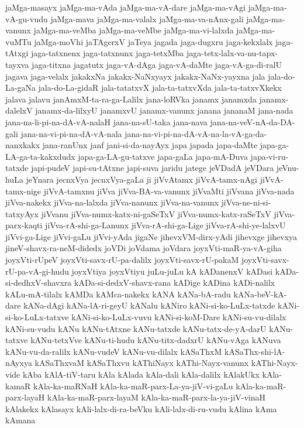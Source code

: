 {jaMga-masayx
jaMga-ma-vAda
jaMga-ma-vA-dare
jaMga-ma-vAgi
jaMga-ma-vA-gu-vudu
jaMga-mava
jaMga-ma-valalx
jaMga-ma-va-nAnx-gali
jaMga-ma-vanunx
jaMga-ma-veMba
jaMga-ma-veMbe
jaMga-ma-vi-lalxda
jaMga-ma-vuMTu
jaMga-moVhi
jaTAgerxV
jaTeya
jagada
jaga-dugxru
jaga-kekxlalx
jaga-tAtxgi
jaga-tatxnenx
jaga-tatxnunx
jaga-tetxMba
jaga-tetx-lalx-va-nu-tapx-tayxva
jaga-titxna
jagatutx
jaga-vA-dAga
jaga-vA-daMte
jaga-vA-ga-di-ralU
jagava
jaga-velalx
jakakxNa
jakakx-NaNxyayx
jakakx-NaNx-yayxna
jala
jala-do-La-gaNa
jala-do-La-gidaR
jala-tatatxvX
jala-ta-tatxvXda
jala-ta-tatxvXkekx
jalava
jalavu
janAmxM-ta-ra-ga-Lalilx
jana-loRVka
janamx
janamxda
janamx-dalelxV
janamx-da-lilxyU
janamxvU
janamx-vanunx
janana
jananaM
jana-nada
jana-na-li-pi-na-dA-vA-nalaH
jana-na-sU-taka
jana-nava
jana-na-veV-nA-da-DA-gali
jana-na-vi-pi-na-dA-vA-nala
jana-na-vi-pi-na-dA-vA-na-la-vA-ga-da-nanxkakx
jana-ranUnx
janf
jani-si-da-nayAyx
japa
japada
japa-daMte
japa-ga-LA-ga-ta-kakxdudx
japa-ga-LA-gu-tatxve
japa-gaLa
japa-mA-Duva
japa-vi-ru-tatxde
japi-pudeV
japi-su-tAtxne
japi-suva
jaridu
jatege
jeVDadA
jeVDara
jeVnu-huLa
jeYnara
jecnxVya
jecnxVya-gaLa
ji
jiVvAtamx
jiVvA-tamx-nAgi
jiVvA-tamx-nige
jiVvA-tamxnu
jiVva
jiVva-BA-va-vanunx
jiVvaMti
jiVvana
jiVva-nada
jiVva-nakekx
jiVva-na-lalxda
jiVva-nanunx
jiVva-na-vanunx
jiVva-ne-ni-si-tatxyAyx
jiVvanu
jiVva-numx-katx-ni-gaSeTxV
jiVva-numx-katx-raSeTxV
jiVva-parx-kaqti
jiVva-rA-shi-ga-Lanunx
jiVva-rA-shi-ga-Lige
jiVva-rA-shi-ye-lalxvU
jiVvi-ga-Lige
jiVvi-gaLu
jiVvi-yAda
jigaNe
jihevxVM-dirx-yAdi
jihevxge
jihevxya
jineV-shavx-ra-neM-didedx
joVDi
joVdama
joVdara
joyxVti-maR-ya-vA-giha
joyxVti-rUpeV
joyxVti-savx-rU-pa-dalilx
joyxVti-savx-rU-pakaM
joyxVti-savx-rU-pa-vA-gi-hudu
joyxVtiya
joyxVtiyu
juLu-juLu
kA
kADanenxV
kADasi
kADa-si-dedhxV-shavxra
kADa-si-dedxV-shavx-rana
kADige
kADina
kADi-nalilx
kALu-mA-tilalx
kAMDa
kAMca-nakekx
kANA
kANa-bA-radu
kANa-beV-kA-dare
kANa-dAgi
kANa-lA-ri-geyU
kANalu
kANiro
kANi-si-ko-LuLx-tatxde
kANi-si-ko-LuLx-tatxve
kANi-si-ko-LuLx-vuvu
kANi-si-koM-Dare
kANi-su-vu-dilalx
kANi-su-vudu
kANu
kANu-tAtxne
kANu-tatxde
kANu-tatx-de-yA-darU
kANu-tatxve
kANu-tetxVve
kANu-ti-hudu
kANu-titx-dadxrU
kANu-vAga
kANuva
kANu-vu-da-ralilx
kANu-vudeV
kANu-vu-dilalx
kASaThxM
kASaThx-shi-lA-nAyxya
kASaThxvaM
kASaThxvu
kAThiNayx
kAThi-Nayx-vanunx
kAThi-Nayx-vide
kAba
kAlA-tiV-taru
kAla
kAlada
kAla-dali
kAla-dalilx
kAlakUkx
kAla-kamaR
kAla-ka-maRNaH
kAla-ka-maR-parx-La-ya-jiV-vi-gaLu
kAla-ka-maR-parx-layaH
kAla-ka-maR-parx-layaM
kAla-ka-maR-parx-la-ya-jiV-vinaH
kAlakekx
kAlasayx
kAli-lalx-di-ra-beVku
kAli-lalx-di-ru-vudu
kAlina
kAma
kAmana
}
